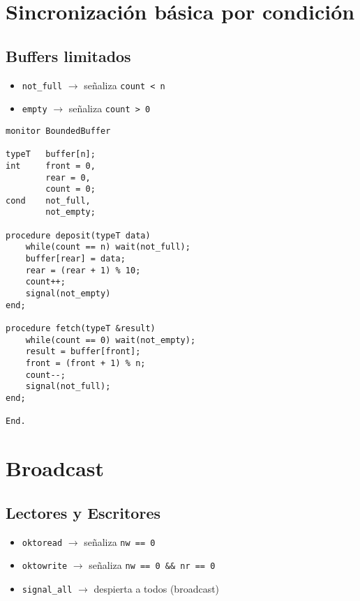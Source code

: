 \documentclass[a4paper, 10pt]{report}
\begin{document}
\section{Sincronización básica por condición}

\subsection{Buffers limitados}

\begin{itemize}
    \item \lstinline{not_full} $\rightarrow$ señaliza \lstinline{count < n}
    \item \lstinline{empty} $\rightarrow$ señaliza \lstinline{count > 0}
\end{itemize}

\begin{lstlisting}[multicols=2]
monitor BoundedBuffer

typeT   buffer[n];
int     front = 0,
        rear = 0,
        count = 0;
cond    not_full,
        not_empty;

procedure deposit(typeT data)
    while(count == n) wait(not_full);
    buffer[rear] = data;
    rear = (rear + 1) % 10;
    count++;
    signal(not_empty)
end;

procedure fetch(typeT &result)
    while(count == 0) wait(not_empty);
    result = buffer[front];
    front = (front + 1) % n;
    count--;
    signal(not_full);
end;

End.
\end{lstlisting}


\section{Broadcast}

\subsection{Lectores y Escritores}

\begin{itemize}
    \item \lstinline{oktoread} $\rightarrow$ señaliza \lstinline{nw == 0}
    \item \lstinline{oktowrite} $\rightarrow$ señaliza \lstinline{nw == 0 && nr == 0}
    \item \lstinline{signal_all} $\rightarrow$ despierta a todos (broadcast)
\end{itemize}
\end{document}
